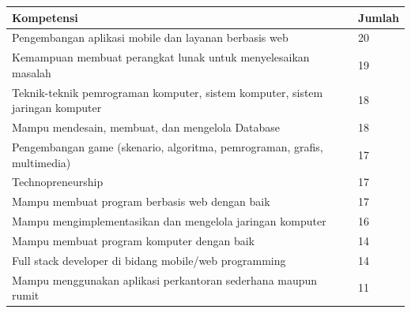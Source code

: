 \begin{center}
\begin{tabular}{L{10cm}C{2.5cm}}
\toprule
Kompetensi & Jumlah \\
\midrule
Pengembangan aplikasi mobile dan layanan berbasis web & 20 \\
Kemampuan membuat perangkat lunak untuk menyelesaikan masalah & 19 \\
Teknik-teknik pemrograman komputer, sistem komputer, sistem jaringan komputer & 18 \\
Mampu mendesain, membuat, dan mengelola Database & 18 \\
Pengembangan game (skenario, algoritma, pemrograman, grafis, multimedia) & 17 \\
Technopreneurship & 17 \\
Mampu membuat program berbasis web dengan baik & 17 \\
Mampu mengimplementasikan dan mengelola jaringan komputer & 16 \\
Mampu membuat program komputer dengan baik & 14 \\
Full stack developer di bidang mobile/web programming & 14 \\
Mampu menggunakan aplikasi perkantoran sederhana maupun rumit & 11 \\
\bottomrule
\end{tabular}
\end{center}

